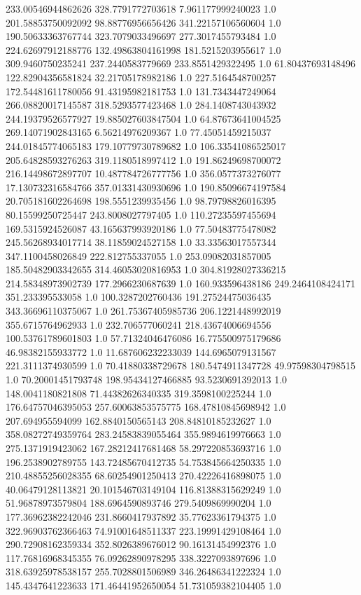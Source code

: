 233.00546944862626	328.7791772703618	7.961177999240023	1.0
201.58853750092092	98.88776956656426	341.22157106560604	1.0
190.50633363767744	323.7079033496697	277.3017455793484	1.0
224.62697912188776	132.49863804161998	181.5215203955617	1.0
309.9460750235241	237.2440583779669	233.8551429322495	1.0
61.80437693148496	122.82904356581824	32.21705178982186	1.0
227.5164548700257	172.54481611780056	91.43195982181753	1.0
131.7343447249064	266.08820017145587	318.5293577423468	1.0
284.1408743043932	244.19379526577927	19.885027603847504	1.0
64.87673641004525	269.14071902843165	6.56214976209367	1.0
77.45051459215037	244.01845774065183	179.10779730789682	1.0
106.33541086525017	205.64828593276263	319.1180518997412	1.0
191.86249698700072	216.14498672897707	10.487784726777756	1.0
356.0577373276077	17.130732316584766	357.01331430930696	1.0
190.85096674197584	20.705181602264698	198.5551239935456	1.0
98.79798826016395	80.15599250725447	243.8008027797405	1.0
110.27235597455694	169.5315924526087	43.165637993920186	1.0
77.50483775478082	245.56268934017714	38.11859024527158	1.0
33.33563017557344	347.1100458026849	222.812755337055	1.0
253.09082031857005	185.50482903342655	314.46053020816953	1.0
304.81928027336215	214.58348973902739	177.2966230687639	1.0
160.933596438186	249.2464108424171	351.233395533058	1.0
100.3287202760436	191.27524475036435	343.36696110375067	1.0
261.75367405985736	206.1221448992019	355.6715764962933	1.0
232.706577060241	218.43674006694556	100.53761789601803	1.0
57.71324046476086	16.775500975179686	46.98382155933772	1.0
11.687606232233039	144.6965079131567	221.3111374930599	1.0
70.41880338729678	180.5474911347728	49.97598304798515	1.0
70.20001451793748	198.95434127466885	93.5230691392013	1.0
148.0041180821808	71.44382626340335	319.3598100225244	1.0
176.64757046395053	257.60063853575775	168.47810845698942	1.0
207.694955594099	162.8840150565143	208.84810185232627	1.0
358.08272749359764	283.24583839055464	355.9894619976663	1.0
275.1371919423062	167.28212417681468	58.297220853693716	1.0
196.2538902789755	143.72485670412735	54.753845664250335	1.0
210.48855256028355	68.60254901250413	270.42226416898075	1.0
40.06479128113821	20.101546703149104	116.81388315629249	1.0
51.96878973579804	188.6964590893746	279.5409869990204	1.0
177.36962382242046	231.8660417937892	35.77623361794375	1.0
322.96903762366463	74.91001648511337	223.19991429108464	1.0
290.72908162359334	352.8026389676012	90.16131454992376	1.0
117.76816968345355	76.09262890978295	338.3227093897696	1.0
318.63925978538157	255.7028801506989	346.26486341222324	1.0
145.4347641223633	171.46441952650054	51.731059382104405	1.0
